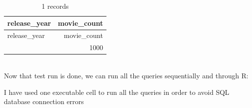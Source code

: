 \documentclass[
  12pt,
]{article}
\makeatletter
\let\oldparagraph\paragraph
\renewcommand{\paragraph}{
    \@ifstar
      \xxxParagraphStar
      \xxxParagraphNoStar
  }
\newcommand{\xxxParagraphStar}[1]{\oldparagraph*{#1}\mbox{}}
\newcommand{\xxxParagraphNoStar}[1]{\oldparagraph{#1}\mbox{}}
\makeatother
\begin{document}
\begin{longtable}[]{@{}lr@{}}
\caption{1 records}\tabularnewline
\toprule\noalign{}
release\_year & movie\_count \\
\midrule\noalign{}
\endfirsthead
\toprule\noalign{}
release\_year & movie\_count \\
\midrule\noalign{}
\endhead
\bottomrule\noalign{}
\endlastfoot
2006 & 1000 \\
\end{longtable}

\begin{verbatim}
\end{verbatim}

\paragraph{Now that test run is done, we can run all the queries
sequentially and through
R:}\label{now-that-test-run-is-done-we-can-run-all-the-queries-sequentially-and-through-r}

I have used one executable cell to run all the queries in order to avoid
SQL database connection errors
\end{document}
